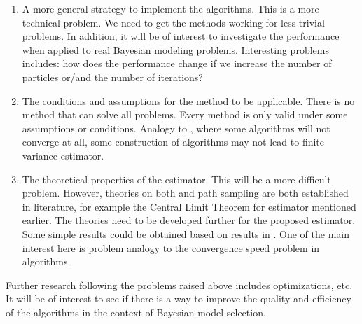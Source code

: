 \begin{enumerate}
  \item A more general strategy to implement the algorithms. This is a more
    technical problem. We need to get the methods working for less trivial
    problems. In addition, it will be of interest to investigate the
    performance when applied to real Bayesian modeling problems. Interesting
    problems includes: how does the performance change if we increase the
    number of particles or/and the number of iterations?
  \item The conditions and assumptions for the method to be applicable. There
    is no method that can solve all problems. Every method is only valid under
    some assumptions or conditions. Analogy to \mcmc, where some algorithms
    will not converge at all, some construction of \smc algorithms may not
    lead to finite variance estimator.
  \item The theoretical properties of the estimator. This will be a more
    difficult problem. However, theories on both \smc and path sampling are
    both established in literature, for example the Central Limit Theorem for
    \smc estimator mentioned earlier. The theories need to be developed
    further for the proposed estimator. Some simple results could be obtained
    based on results in \textcite{DelMoral2006}. One of the main interest here
    is problem analogy to the convergence speed problem in \mcmc algorithms.
\end{enumerate}

Further research following the problems raised above includes optimizations,
etc. It will be of interest to see if there is a way to improve the quality
and efficiency of the algorithms in the context of Bayesian model selection.
